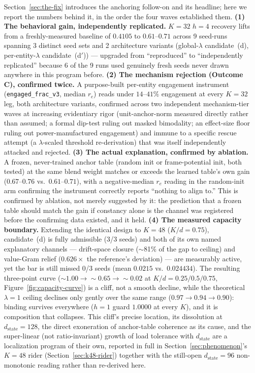 Section~\ref{sec:the-fix} introduces the anchoring follow-on and its
headline; here we report the numbers behind it, in the order the four
waves established them. \textbf{(1) The behavioral gain, independently
replicated.} $K{=}32$ $h{=}4$ recovery lifts from a freshly-measured
baseline of $0.4105$ to $0.61$--$0.71$ across 9 seed-runs spanning 3
distinct seed sets and 2 architecture variants (global-$\lambda$
candidate~(d), per-entity-$\lambda$ candidate~(d$'$)) --- upgraded from
``reproduced'' to ``independently replicated'' because 6 of the 9 runs
used genuinely fresh seeds never drawn anywhere in this program before.
\textbf{(2) The mechanism rejection (Outcome C), confirmed twice.} A
purpose-built per-entity engagement instrument
(\texttt{engaged\_frac\_v3}, median $r_e$) reads under $14$--$41\%$
engagement at every $K{=}32$ leg, both architecture variants, confirmed
across two independent mechanism-tier waves at increasing evidentiary
rigor (unit-anchor-norm measured directly rather than assumed; a formal
dip-test ruling out masked bimodality; an effect-size floor ruling out
power-manufactured engagement) and immune to a specific rescue attempt
(a $\lambda$-scaled threshold re-derivation) that was itself
independently attacked and rejected. \textbf{(3) The actual explanation,
confirmed by ablation.} A frozen, never-trained anchor table (random
init or frame-potential init, both tested) at the same blend weight
matches or exceeds the learned table's own gain ($0.67$--$0.76$ vs.\
$0.61$--$0.71$), with a negative-median $r_e$ reading in the random-init
arm confirming the instrument correctly reports ``nothing to align to.''
This is confirmed by ablation, not merely suggested by it: the
prediction that a frozen table should match the gain if constancy alone
is the channel was registered before the confirming data existed, and it
held. \textbf{(4) The measured capacity boundary.} Extending the
identical design to $K{=}48$ ($K/d{=}0.75$), candidate~(d) is fully
admissible (3/3 seeds) and both of its own named explanatory channels
--- drift-space closure ($\sim$81\% of the gap to ceiling) and value-Gram
relief ($0.626\times$ the reference's deviation) --- are measurably
active, yet the bar is still missed 0/3 seeds (mean $0.0215$ vs.\
$0.024434$). The resulting three-point curve
($\sim1.00\to\sim0.65\to\sim0.02$ at $K/d{=}0.25/0.5/0.75$,
Figure~\ref{fig:capacity-curve}) is a cliff, not a smooth decline, while
the theoretical $\lambda{=}1$ ceiling declines only gently over the same
range ($0.97\to0.94\to0.90$): binding survives everywhere ($h{=}1$ guard
$1.0000$ at every $K$), and it is composition that collapses. This
cliff's precise location, its dissolution at $d_{\mathrm{state}}{=}128$,
the direct exoneration of anchor-table coherence as its cause, and the
super-linear (not ratio-invariant) growth of load tolerance with
$d_{\mathrm{state}}$ are a localization program of their own, reported in
full in Section~\ref{sec:phenomenon}'s $K{=}48$ rider
(Section~\ref{sec:k48-rider}) together with the still-open
$d_{\mathrm{state}}{=}96$ non-monotonic reading rather than re-derived
here.

